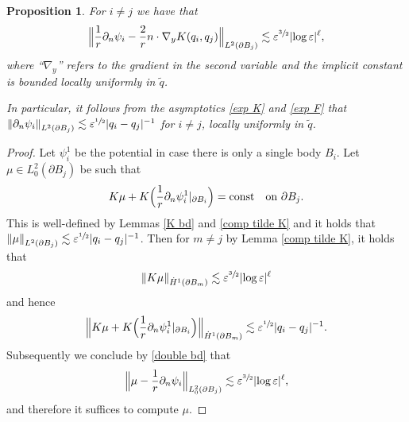 \documentclass[10pt]{amsart}
\let\epsilon\varepsilon
\newcommand{\const}{\textup{const}}
\newtheorem{proposition}[theorem]{Proposition}
\theoremstyle{definition}
\newcommand\norm[1]{\left\lVert #1\right\rVert}
\newcommand\Bnorm[1]{\Bigl\lVert #1\Bigr\rVert}
\newcommand\eq{=}
\let\de\partial
\let\eps\epsilon
\begin{document}
\begin{proposition}\label{1st order exp}
For $i\neq j$ we have that\vspace*{-3pt}
\begin{align*}
\Bnorm{\frac{1}{r}\de_n\psi_i-\frac{2}{r}n\cdot\nabla_yK(q_i,q_j)}_{L^2(\de B_j)}\lesssim \eps^{\sfrac{3}{2}}|{\log\eps}|^\ell,
\end{align*}
where ``$\nabla_y$'' refers to the gradient in the second variable and the implicit constant is bounded locally uniformly in $\tilde{q}$.

In particular, it follows from the asymptotics \eqref{exp K} and \eqref{exp F} that $\norm{\de_n\psi_i}_{L^2(\de B_j)}\lesssim \eps^{\sfrac{1}{2}}|q_i-q_j|^{-1}$ for $i\neq j$, locally uniformly in $\tilde{q}$.
\end{proposition}
\begin{proof}
Let $\psi_i^1$ be the potential in case there is only a single body $B_i$.
Let $\mu\in L_0^2(\de B_j)$ be such that\vspace*{-3pt}
\begin{align*}
K\mu+K\Bigl(\frac{1}{r}\de_n\psi_i^1|_{\de B_i}\Bigr)\eq \const \quad\text{on $\de B_j$}.
\end{align*}
This is well-defined by Lemmas \ref{K bd} and \ref{comp tilde K} and it holds that $\norm{\mu}_{L^2(\de B_j)}\lesssim \eps^{\sfrac{1}{2}}|q_i-\nobreak q_j|^{-1}$.
Then for $m\neq j$ by Lemma \ref{comp tilde K}, it holds that\vspace*{-3pt}
\begin{align*}
\norm{K\mu}_{\dot{H}^1(\de B_m)}\lesssim \eps^{\sfrac{3}{2}}|{\log\eps}|^\ell
\end{align*}
and hence\vspace*{-3pt}
\begin{align*}
\Bnorm{K\mu+K\Bigl(\frac{1}{r}\de_n\psi_i^1|_{\de B_i}\Bigr)}_{\dot{H}^1(\de B_m)}\lesssim \eps^{\sfrac{1}{2}}|q_i-q_j|^{-1}.
\end{align*}
Subsequently we conclude by \eqref{double bd} that\vspace*{-3pt}
\begin{align}\label{comp mu}
\Bnorm{\mu-\frac{1}{r}\de_n\psi_i}_{L_0^2(\de B_j)}\lesssim \eps^{\sfrac{3}{2}}|{\log\eps}|^\ell,
\end{align}
and therefore it suffices to compute $\mu$.


\end{proof}
\end{document}
